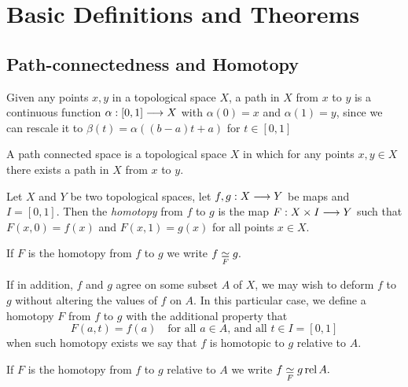 \chapter{Basic Definitions and Theorems}\label{ch:basic-definitions-and-theorems}


\section{Path-connectedness and Homotopy}\label{sec:path-connectedness-and-homotopy}

\begin{defn}[Path]
    Given any points $x,y$ in a topological space $X$, a path in $X$ from $x$ to $y$ is a continuous function $\alpha : [0,1] \longrightarrow X$ with $\alpha(0) = x$ and $\alpha(1) = y$, since we can rescale it to $\beta(t) = \alpha((b-a)t + a)$ for $t \in [0,1]$
\end{defn}
\begin{defn}
    A path connected space is a topological space $X$ in which for any points $x,y \in X$ there exists a path in $X$ from $x$ to $y$.
\end{defn}

\begin{defn}[Homotopy]
    Let $X$ and $Y$ be two topological spaces, let $f,g : X \longrightarrow Y$ be maps and $I = [0,1]$.
    Then the \textit{homotopy} from $f$ to $g$ is the map $F: X \times I \longrightarrow Y$ such that $F(x,0) = f(x)$ and $F(x,1) = g(x)$ for all points $x \in X$.
\end{defn}

\begin{notn}
    If $F$ is the homotopy from $f$ to $g$ we write $\displaystyle f \underset{F}{\simeq} g.$
\end{notn}

If in addition, $f$ and $g$ agree on some subset $A$ of $X$, we may wish to deform $f$ to $g$ without altering the values of $f$ on $A$.
In this particular case, we define a homotopy $F$ from $f$ to $g$ with the additional property that
\[
    F(a,t) = f(a) \quad \text{for all $a \in A$, and all $t \in I = [0,1]$}
\]
when such homotopy exists we say that $f$ is homotopic to $g$ relative to $A$.

\begin{notn}
    If $F$ is the homotopy from $f$ to $g$ relative to $A$ we write $\displaystyle f \underset{F}{\simeq} g \operatorname{rel} A.$
\end{notn}

